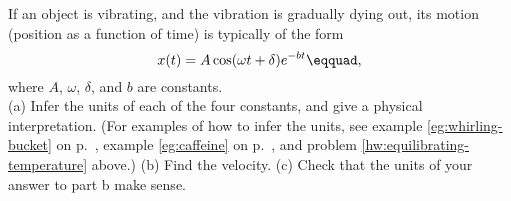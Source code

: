 If an object is vibrating, and the vibration is gradually dying out,
its motion (position as a function of time) is typically of the form
\begin{equation*}
  x(t) = A\cos(\omega t+\delta)e^{-bt}\eqquad,
\end{equation*}
where $A$, $\omega$, $\delta$, and $b$ are constants.\\
(a) Infer the units of each of the four constants, and give a physical interpretation.
(For examples of how to infer the units, see
example \ref{eg:whirling-bucket} on p.~\pageref{eg:whirling-bucket},
example \ref{eg:caffeine} on p.~\pageref{eg:caffeine},
and problem \ref{hw:equilibrating-temperature} above.)
\hwendpart
(b) Find the velocity.\hwendpart
(c) Check that the units of your answer to part b make sense.\answercheck\hwendpart
